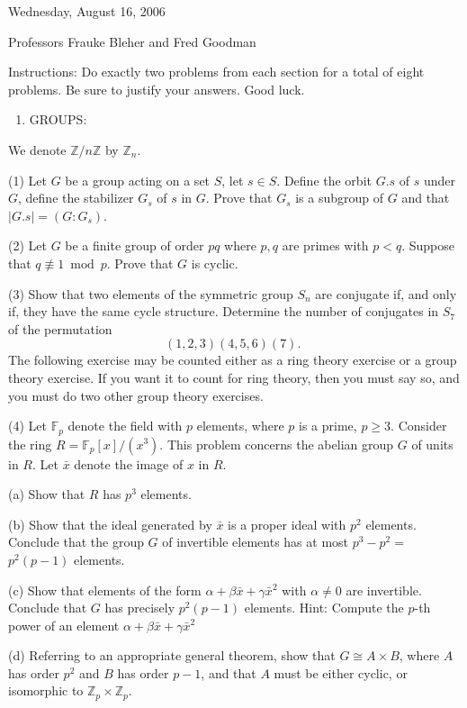 \documentclass[10pt]{article}
\begin{document}
Wednesday, August 16, 2006

Professors Frauke Bleher and Fred Goodman

Instructions: Do exactly two problems from each section for a total of eight problems. Be sure to justify your answers. Good luck.

\begin{enumerate}
  \item GROUPS:
\end{enumerate}
We denote $\mathbb{Z} / n \mathbb{Z}$ by $\mathbb{Z}_{n}$.

(1) Let $G$ be a group acting on a set $S$, let $s \in S$. Define the orbit $G . s$ of $s$ under $G$, define the stabilizer $G_{s}$ of $s$ in $G$. Prove that $G_{s}$ is a subgroup of $G$ and that $|G . s|=\left(G: G_{s}\right)$.

(2) Let $G$ be a finite group of order $p q$ where $p, q$ are primes with $p<q$. Suppose that $q \not \equiv 1 \bmod p$. Prove that $G$ is cyclic.

(3) Show that two elements of the symmetric group $S_{n}$ are conjugate if, and only if, they have the same cycle structure. Determine the number of conjugates in $S_{7}$ of the permutation
$$
(1,2,3)(4,5,6)(7) \text {. }
$$
The following exercise may be counted either as a ring theory exercise or a group theory exercise. If you want it to count for ring theory, then you must say so, and you must do two other group theory exercises.

(4) Let $\mathbb{F}_{p}$ denote the field with $p$ elements, where $p$ is a prime, $p \geq 3$. Consider the ring $R=\mathbb{F}_{p}[x] /\left(x^{3}\right)$. This problem concerns the abelian group $G$ of units in $R$. Let $\bar{x}$ denote the image of $x$ in $R$.

(a) Show that $R$ has $p^{3}$ elements.

(b) Show that the ideal generated by $\bar{x}$ is a proper ideal with $p^{2}$ elements. Conclude that the group $G$ of invertible elements has at most $p^{3}-p^{2}=$ $p^{2}(p-1)$ elements.

(c) Show that elements of the form $\alpha+\beta \bar{x}+\gamma \bar{x}^{2}$ with $\alpha \neq 0$ are invertible. Conclude that $G$ has precisely $p^{2}(p-1)$ elements. Hint: Compute the $p$-th power of an element $\alpha+\beta \bar{x}+\gamma \bar{x}^{2}$

(d) Referring to an appropriate general theorem, show that $G \cong A \times B$, where $A$ has order $p^{2}$ and $B$ has order $p-1$, and that $A$ must be either cyclic, or isomorphic to $\mathbb{Z}_{p} \times \mathbb{Z}_{p}$.
\end{document}
